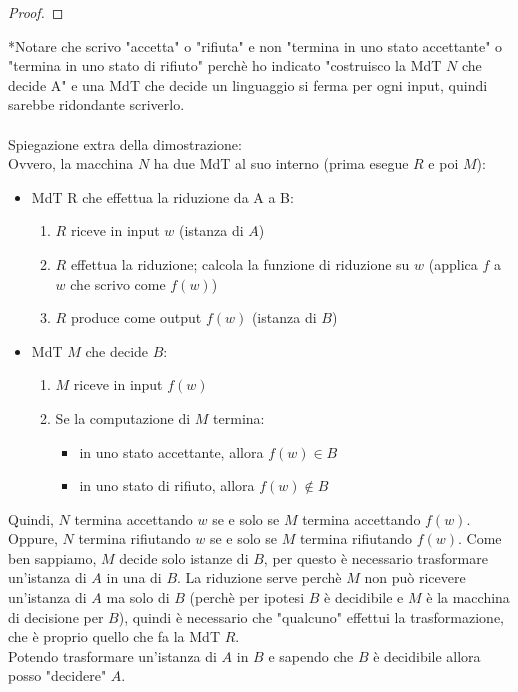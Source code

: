 \documentclass{article}  %
\theoremstyle{definition}
\begin{document}
\begin{esercizio}[Dimostrazione 3.1]
\begin{proof}
	\end{proof}
	*Notare che scrivo "accetta" o "rifiuta" e non "termina in uno stato accettante" o "termina in uno stato di rifiuto" perchè
	ho indicato "costruisco la MdT $N$ che decide A" e una MdT che decide un linguaggio si ferma per ogni input, quindi sarebbe ridondante
	scriverlo. \\ \\
	Spiegazione extra della dimostrazione: \\
	Ovvero, la macchina $N$ ha due MdT al suo interno (prima esegue $R$ e poi $M$):
	\begin{itemize}
		\item MdT R che effettua la riduzione da A a B:
		      \begin{enumerate}
			      \item $R$ riceve in input $w$ (istanza di $A$)
			      \item $R$ effettua la riduzione; calcola la funzione di riduzione su $w$ (applica $f$ a $w$ che scrivo come $f(w)$)
			      \item $R$ produce come output $f(w)$ (istanza di $B$)
		      \end{enumerate}
		\item MdT $M$ che decide $B$:
		      \begin{enumerate}
			      \item $M$ riceve in input $f(w)$
			      \item Se la computazione di $M$ termina:
			            \begin{itemize}
				            \item in uno stato accettante, allora $f(w) \in B$
				            \item in uno stato di rifiuto, allora $f(w) \notin B$
			            \end{itemize}
		      \end{enumerate}
	\end{itemize}
	Quindi, $N$ termina accettando $w$ se e solo se $M$ termina accettando $f(w)$. Oppure, $N$ termina rifiutando $w$ se e solo se $M$ termina
	rifiutando $f(w)$.
	Come ben sappiamo, $M$ decide solo istanze di $B$, per questo è necessario trasformare un'istanza di $A$ in una di $B$.
	La riduzione serve perchè $M$ non può ricevere un'istanza di $A$ ma solo di $B$ (perchè per ipotesi $B$ è decidibile e $M$ è
	la macchina di decisione per $B$), quindi è necessario che "qualcuno" effettui la trasformazione, che è proprio quello che fa la MdT $R$.\\
	Potendo trasformare un'istanza di $A$ in $B$ e sapendo che $B$ è decidibile allora posso "decidere" $A$.
\end{esercizio}
\end{document}
